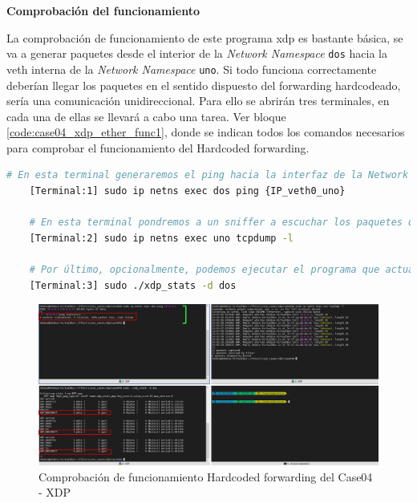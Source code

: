 \vspace{0.5cm}
\textbf{Comprobación del funcionamiento}\\
\par
La comprobación de funcionamiento de este programa \gls{xdp} es bastante básica, se va a generar paquetes desde el interior de la \textit{Network Namespace}  \texttt{dos} hacia la \gls{veth} interna de la \textit{Network Namespace} \texttt{uno}. Si todo funciona correctamente deberían llegar los paquetes en el sentido dispuesto del forwarding hardcodeado, sería una comunicación unidireccional. Para ello se abrirán tres terminales, en cada una de ellas se llevará a cabo una tarea. Ver bloque \ref{code:case04_xdp_ether_func1}, donde se indican todos los comandos necesarios para comprobar el funcionamiento del Hardcoded forwarding.

\begin{lstlisting}[language= bash, style=Consola, caption={Comprobación del funcionamiento Hardcoded forwarding - Case04},label=code:case04_xdp_ether_func1]
    # En esta terminal generaremos el ping hacia la interfaz de la Network Namespace "uno" desde la Network Namespace "dos"
    [Terminal:1] sudo ip netns exec dos ping {IP_veth0_uno}
    
    # En esta terminal pondremos a un sniffer a escuchar los paquetes que nos lleguen dentro de la Network Namespace "dos"
    [Terminal:2] sudo ip netns exec uno tcpdump -l
    
    # Por último, opcionalmente, podemos ejecutar el programa que actuaba como recolector de estadísticas sobre los códigos de retorno XDP
    [Terminal:3] sudo ./xdp_stats -d dos
\end{lstlisting}

\begin{figure}[ht]
    \centering
    \includegraphics[width=15.5cm]{archivos/img/dev/xdp/case04/demo_case04_hard_1_edited.png}
    \caption{Comprobación de funcionamiento Hardcoded forwarding del Case04 - XDP}
    \label{fig:case04_xdp_ether_func1_b}
\end{figure}


